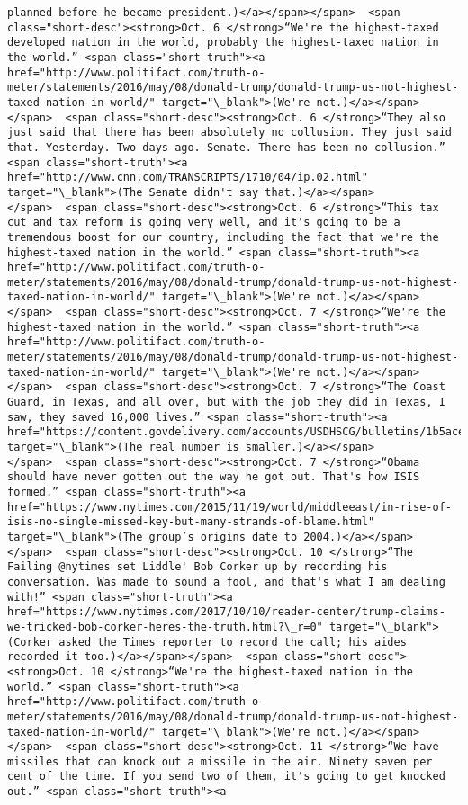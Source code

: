 \documentclass[11pt]{article}
\begin{document}
\begin{Verbatim}[commandchars=\\\{\}]
planned before he became president.)</a></span></span>  <span class="short-desc"><strong>Oct. 6 </strong>“We're the highest-taxed developed nation in the world, probably the highest-taxed nation in the world.” <span class="short-truth"><a href="http://www.politifact.com/truth-o-meter/statements/2016/may/08/donald-trump/donald-trump-us-not-highest-taxed-nation-in-world/" target="\_blank">(We're not.)</a></span></span>  <span class="short-desc"><strong>Oct. 6 </strong>“They also just said that there has been absolutely no collusion. They just said that. Yesterday. Two days ago. Senate. There has been no collusion.” <span class="short-truth"><a href="http://www.cnn.com/TRANSCRIPTS/1710/04/ip.02.html" target="\_blank">(The Senate didn't say that.)</a></span></span>  <span class="short-desc"><strong>Oct. 6 </strong>“This tax cut and tax reform is going very well, and it's going to be a tremendous boost for our country, including the fact that we're the highest-taxed nation in the world.” <span class="short-truth"><a href="http://www.politifact.com/truth-o-meter/statements/2016/may/08/donald-trump/donald-trump-us-not-highest-taxed-nation-in-world/" target="\_blank">(We're not.)</a></span></span>  <span class="short-desc"><strong>Oct. 7 </strong>“We're the highest-taxed nation in the world.” <span class="short-truth"><a href="http://www.politifact.com/truth-o-meter/statements/2016/may/08/donald-trump/donald-trump-us-not-highest-taxed-nation-in-world/" target="\_blank">(We're not.)</a></span></span>  <span class="short-desc"><strong>Oct. 7 </strong>“The Coast Guard, in Texas, and all over, but with the job they did in Texas, I saw, they saved 16,000 lives.” <span class="short-truth"><a href="https://content.govdelivery.com/accounts/USDHSCG/bulletins/1b5ace3" target="\_blank">(The real number is smaller.)</a></span></span>  <span class="short-desc"><strong>Oct. 7 </strong>“Obama should have never gotten out the way he got out. That's how ISIS formed.” <span class="short-truth"><a href="https://www.nytimes.com/2015/11/19/world/middleeast/in-rise-of-isis-no-single-missed-key-but-many-strands-of-blame.html" target="\_blank">(The group’s origins date to 2004.)</a></span></span>  <span class="short-desc"><strong>Oct. 10 </strong>“The Failing @nytimes set Liddle' Bob Corker up by recording his conversation. Was made to sound a fool, and that's what I am dealing with!” <span class="short-truth"><a href="https://www.nytimes.com/2017/10/10/reader-center/trump-claims-we-tricked-bob-corker-heres-the-truth.html?\_r=0" target="\_blank">(Corker asked the Times reporter to record the call; his aides recorded it too.)</a></span></span>  <span class="short-desc"><strong>Oct. 10 </strong>“We're the highest-taxed nation in the world.” <span class="short-truth"><a href="http://www.politifact.com/truth-o-meter/statements/2016/may/08/donald-trump/donald-trump-us-not-highest-taxed-nation-in-world/" target="\_blank">(We're not.)</a></span></span>  <span class="short-desc"><strong>Oct. 11 </strong>“We have missiles that can knock out a missile in the air. Ninety seven per cent of the time. If you send two of them, it's going to get knocked out.” <span class="short-truth"><a 
\end{Verbatim}
\end{document}
